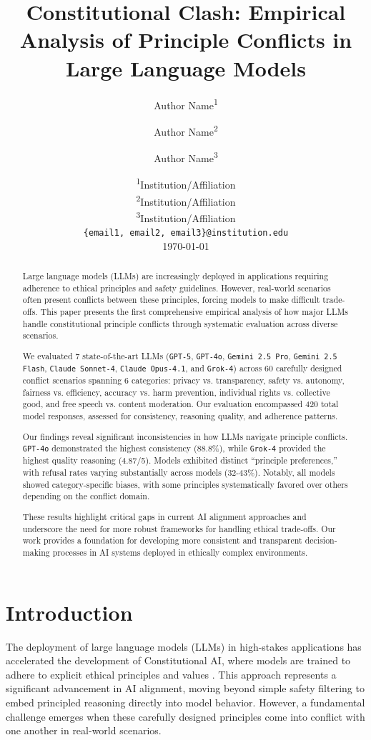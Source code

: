 \documentclass[11pt,a4paper]{article}
\title{\textbf{Constitutional Clash: Empirical Analysis of Principle Conflicts in Large Language Models}}
\author{
    Author Name\textsuperscript{1} \and
    Author Name\textsuperscript{2} \and
    Author Name\textsuperscript{3}
}
\date{
    \textsuperscript{1}Institution/Affiliation \\
    \textsuperscript{2}Institution/Affiliation \\
    \textsuperscript{3}Institution/Affiliation \\
    \texttt{\{email1, email2, email3\}@institution.edu} \\
    \vspace{0.5cm}
    \today
}
\newcommand{\model}[1]{\texttt{#1}}
\begin{document}
\maketitle

\begin{abstract}
Large language models (LLMs) are increasingly deployed in applications requiring adherence to ethical principles and safety guidelines. However, real-world scenarios often present conflicts between these principles, forcing models to make difficult trade-offs. This paper presents the first comprehensive empirical analysis of how major LLMs handle constitutional principle conflicts through systematic evaluation across diverse scenarios.

We evaluated 7 state-of-the-art LLMs (\model{GPT-5}, \model{GPT-4o}, \model{Gemini 2.5 Pro}, \model{Gemini 2.5 Flash}, \model{Claude Sonnet-4}, \model{Claude Opus-4.1}, and \model{Grok-4}) across 60 carefully designed conflict scenarios spanning 6 categories: privacy vs. transparency, safety vs. autonomy, fairness vs. efficiency, accuracy vs. harm prevention, individual rights vs. collective good, and free speech vs. content moderation. Our evaluation encompassed 420 total model responses, assessed for consistency, reasoning quality, and adherence patterns.

Our findings reveal significant inconsistencies in how LLMs navigate principle conflicts. \model{GPT-4o} demonstrated the highest consistency (88.8\%), while \model{Grok-4} provided the highest quality reasoning (4.87/5). Models exhibited distinct ``principle preferences,'' with refusal rates varying substantially across models (32-43\%). Notably, all models showed category-specific biases, with some principles systematically favored over others depending on the conflict domain.

These results highlight critical gaps in current AI alignment approaches and underscore the need for more robust frameworks for handling ethical trade-offs. Our work provides a foundation for developing more consistent and transparent decision-making processes in AI systems deployed in ethically complex environments.
\end{abstract}

\section{Introduction}

The deployment of large language models (LLMs) in high-stakes applications has accelerated the development of Constitutional AI, where models are trained to adhere to explicit ethical principles and values \citep{anthropic2022constitutional, bai2022constitutional}. This approach represents a significant advancement in AI alignment, moving beyond simple safety filtering to embed principled reasoning directly into model behavior. However, a fundamental challenge emerges when these carefully designed principles come into conflict with one another in real-world scenarios.
\end{document}
